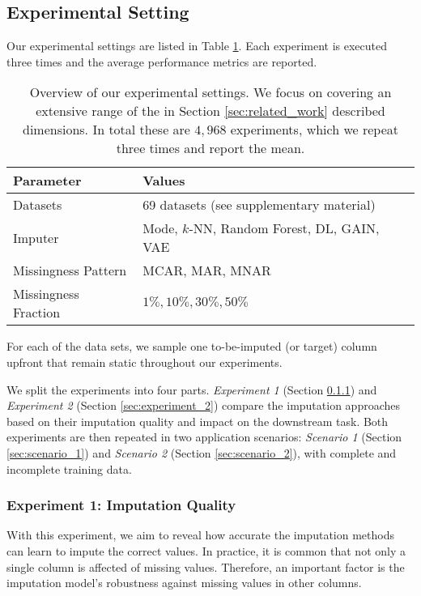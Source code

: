 \subsection{Experimental Setting}
%
Our experimental settings are listed in Table \ref{tab:experiment_settings}. Each experiment is executed three times and the average performance metrics are reported.
%
\begin{table}
	\centering
	\begin{tabular}{ll}
		\toprule
		Parameter            & Values                                     \\ \midrule
		Datasets             & 69 datasets (see supplementary material)    \\
		Imputer              & Mode, $k$-NN, Random Forest, DL, GAIN, VAE \\
		Missingness Pattern  & MCAR, MAR, MNAR                            \\
		Missingness Fraction & $1\%, 10\%, 30\%, 50\%$                      \\ \bottomrule
	\end{tabular}
	\caption{Overview of our experimental settings. We focus on covering an extensive range of the in Section \ref{sec:related_work} described dimensions. In total these are $4,968$ experiments, which we repeat three times and report the mean.}
	\label{tab:experiment_settings}
\end{table}
%
For each of the data sets, we sample one to-be-imputed (or target) column upfront that remain static throughout our experiments.  

We split the experiments into four parts. \emph{Experiment 1} (Section \ref{sec:experiment_1}) and \emph{Experiment 2} (Section \ref{sec:experiment_2}) compare the imputation approaches based on their imputation quality and impact on the downstream task. Both experiments are then repeated in two application scenarios: \emph{Scenario 1} (Section \ref{sec:scenario_1}) and \emph{Scenario 2} (Section \ref{sec:scenario_2}), with complete and incomplete training data.


\subsubsection{Experiment 1: Imputation Quality}
\label{sec:experiment_1}
%
With this experiment, we aim to reveal how accurate the imputation methods can learn to impute the correct values. In practice, it is common that not only a single column is affected of missing values. Therefore, an important factor is the imputation model's robustness against missing values in other columns.

